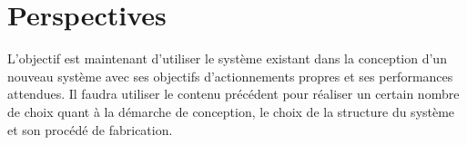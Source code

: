 \documentclass[10pt, a4paper]{article}
\begin{document}
        
        
\section{Perspectives}

    L'objectif est maintenant d'utiliser le système existant dans la conception d'un nouveau système avec ses objectifs d'actionnements propres et ses performances attendues. Il faudra utiliser le contenu précédent pour réaliser un certain nombre de choix quant à la démarche de conception, le choix de la structure du système et son procédé de fabrication.







\listoffigures
\end{document}
